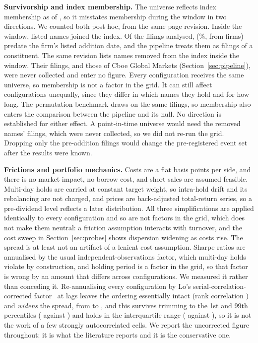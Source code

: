 \documentclass[sigconf]{acmart}
\begin{document}
\textbf{Survivorship and index membership.} The universe reflects index membership as of
\MemRevisionDate{}, so it misstates membership during the window in two directions. We counted both post hoc,
from the same page revision. Inside the window, \MemJoiners{} listed names joined the index. Of the
\NumEvents{} filings analysed, \MemPreEvents{} (\MemPrePct{}\%, from \MemPreFirms{} firms)
predate the firm's listed addition date, and the pipeline treats them as filings of a constituent.
The same revision lists \MemRemovals{} names removed from the index inside the window. Their filings,
and those of Cboe Global Markets (Section~\ref{sec:pipeline}), were never collected and enter no
figure. Every configuration receives the same universe, so membership is not a
factor in the grid. It can still affect configurations unequally, since they differ in which names
they hold and for how long. The permutation benchmark draws on the same filings, so membership also
enters the comparison between the pipeline and its null. No direction is established for either
effect. A point-in-time universe would need the removed names' filings, which were never collected,
so we did not re-run the grid. Dropping only the pre-addition filings would change the
pre-registered event set after the results were known.

\textbf{Frictions and portfolio mechanics.} Costs are a flat \CostBps{} basis points per side, and
there is no market impact, no borrow cost, and short sales are assumed feasible. Multi-day holds are
carried at constant target weight, so intra-hold drift and its rebalancing are not charged, and
prices are back-adjusted total-return series, so a pre-dividend level reflects a later distribution.
All three simplifications are applied identically to every configuration and so are not factors in the grid, which
does not make them neutral: a friction assumption interacts with turnover, and the cost sweep in
Section~\ref{sec:probes} shows dispersion widening as costs rise. The spread is at least not an
artifact of a lenient cost assumption. Sharpe ratios are
annualised by the usual independent-observations factor, which multi-day holds violate by
construction, and holding period is a factor in the grid, so that factor is wrong by an amount that
differs across configurations. We measured it rather than conceding it. Re-annualising every
configuration by Lo's serial-correlation-corrected factor~\cite{lo2002sharpe} at \RobustLags{} lags
leaves the ordering essentially intact (rank correlation \RobustRankCorr{}) and \emph{widens} the spread, from
\SharpeSD{} to \RobustSD{}, and this survives trimming to the 1st and 99th percentiles
(\StdSDTrimmed{} against \RobustSDTrimmed{}) and holds in the interquartile range (\StdIQR{}
against \RobustIQR{}), so it is not the work of a few strongly autocorrelated cells. We report the
uncorrected figure throughout: it is what the literature reports and it is the conservative one.
\end{document}
